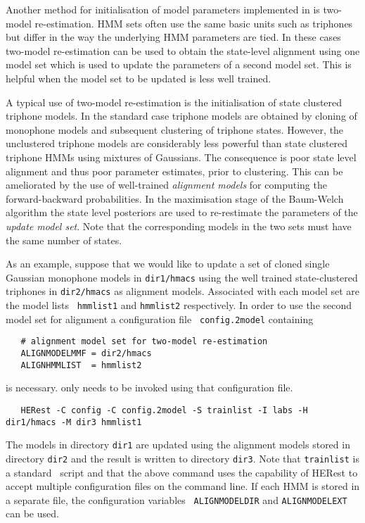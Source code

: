 
Another method for initialisation of model parameters implemented in
 is two-model re-estimation. HMM sets often use the same
basic units such as triphones but differ in the way the underlying HMM
parameters are tied. In these cases two-model re-estimation can be
used to obtain the state-level alignment using one model set which is
used to update the parameters of a second model set. This is helpful
when the model set to be updated is less well trained.

A typical use of two-model re-estimation is the initialisation of state clustered triphone
models. In the standard case triphone models are obtained by cloning
of monophone models and subsequent clustering of triphone states.
However, the unclustered triphone models are considerably less
powerful than state clustered triphone HMMs using mixtures of
Gaussians. The consequence is poor state level alignment and thus poor
parameter estimates, prior to clustering.  This can be ameliorated by
the use of well-trained \textit{alignment models} for computing the
forward-backward probabilities. In the maximisation stage of the
Baum-Welch algorithm the state level posteriors are used to
re-restimate the parameters of the \textit{update model set}. Note that
the corresponding models in the two sets must have the same number of
states.

As an example, suppose that we would like to update a set of cloned
single Gaussian monophone models in {\tt dir1/hmacs} using the well
trained state-clustered triphones in {\tt dir2/hmacs} as alignment
models. Associated with each model set are the model lists {\tt
  hmmlist1} and {\tt hmmlist2} respectively. In order to use the
second model set for alignment a configuration file {\tt
  config.2model} containing
\begin{verbatim}
   # alignment model set for two-model re-estimation
   ALIGNMODELMMF = dir2/hmacs
   ALIGNHMMLIST  = hmmlist2
\end{verbatim}
is necessary.  only needs to be invoked using that
configuration file.
\begin{verbatim}
   HERest -C config -C config.2model -S trainlist -I labs -H dir1/hmacs -M dir3 hmmlist1
\end{verbatim}
The models in directory {\tt dir1} are updated using the alignment
models stored in directory {\tt dir2} and the result is written to
directory {\tt dir3}. Note that {\tt trainlist} is a standard \HTK\ 
script and that the above command uses the capability of HERest to
accept multiple configuration files on the command line. If each HMM
is stored in a separate file, the configuration variables {\tt
  ALIGNMODELDIR} and {\tt ALIGNMODELEXT} can be used.

